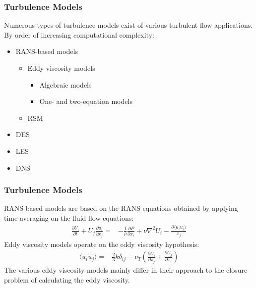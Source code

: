 \begin{frame}
  \frametitle{Turbulence Models}
  Numerous types of turbulence models exist of various turbulent flow applications. By order of
  increasing computational complexity:
  \begin{itemize}
      \item RANS-based models
      \begin{itemize}
          \item Eddy viscosity models
          \begin{itemize}
              \item Algebraic models
              \item One- and two-equation models
          \end{itemize}
          \item \gls{RSM}
      \end{itemize}
      \item \gls{DES}
      \item \gls{LES}
      \item \gls{DNS}
  \end{itemize}
\end{frame}

\begin{frame}
  \frametitle{Turbulence Models}
  RANS-based models are based on the RANS equations obtained by applying time-averaging on the
  fluid flow equations:
  \begin{align}
      \frac{\partial U_i}{\partial t} + U_j \frac{\partial u_i}{\partial x_j} =&
      -\frac{1}{\rho} \frac{\partial P}{\partial x_i} + \nu \nabla^2 U_i -
      \frac{\partial \langle u_i u_j \rangle}{x_j}
  \end{align}
  Eddy viscosity models operate on the eddy viscosity hypothesis:
  \begin{align}
      \langle u_iu_j \rangle =& \frac{2}{3}k \delta_{ij} - \nu_T \left(
      \frac{\partial U_i}{\partial x_j} + \frac{\partial U_j}{\partial x_i}
      \right)
  \end{align}
  The various eddy viscosity models mainly differ in their approach to the closure problem of
  calculating the eddy viscosity.
\end{frame}

